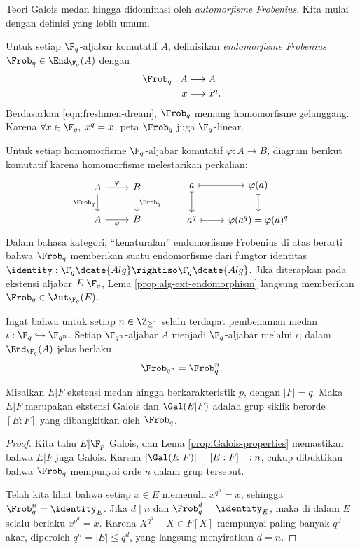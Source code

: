 Teori Galois medan hingga didominasi oleh \emph{automorfisme Frobenius}. Kita mulai dengan definisi yang lebih umum.
\begin{definition}\label{def:Frob-aut} 
	Untuk setiap $\F_q$-aljabar komutatif $A$, definisikan \emph{endomorfisme Frobenius} $\Frob_q \in \End_{\F_q}(A)$ dengan
	\begin{align*}
		\Frob_q: A & \longrightarrow A \\
		x & \longmapsto x^q.
	\end{align*}
	Berdasarkan \eqref{eqn:freshmen-dream}, $\Frob_q$ memang homomorfisme gelanggang. Karena $\forall x \in \F_q, \; x^q=x$, peta $\Frob_q$ juga $\F_q$-linear.
\end{definition}
Untuk setiap homomorfisme $\F_q$-aljabar komutatif $\varphi:A\to B$, diagram berikut komutatif karena homomorfisme melestarikan perkalian:
\[\begin{tikzcd}
	A \arrow[r, "\varphi"] \arrow[d, "\Frob_q"'] & B \arrow[d, "\Frob_q"] \\
	A \arrow[r, "\varphi"'] & B
\end{tikzcd} \qquad \begin{tikzcd}
	a \arrow[mapsto, r] \arrow[mapsto, d] & \varphi(a) \arrow[mapsto, d] \\
	a^q \arrow[mapsto, r] & \varphi(a^q) = \varphi(a)^q
\end{tikzcd}\]
Dalam bahasa kategori, ``kenaturalan'' endomorfisme Frobenius di atas berarti bahwa $\Frob_q$ memberikan suatu endomorfisme dari fungtor identitas $\identity:\F_q\dcate{Alg}\rightiso\F_q\dcate{Alg}$. Jika diterapkan pada ekstensi aljabar $E|\F_q$, Lema \ref{prop:alg-ext-endomorphism} langsung memberikan $\Frob_q\in\Aut_{\F_q}(E)$.

Ingat bahwa untuk setiap $n\in\Z_{\geq1}$ selalu terdapat pembenaman medan $\iota:\F_q\hookrightarrow\F_{q^n}$. Setiap $\F_{q^n}$-aljabar $A$ menjadi $\F_q$-aljabar melalui $\iota$; dalam $\End_{\F_q}(A)$ jelas berlaku
\[ \Frob_{q^n} = \Frob_q^n. \]

\begin{theorem}\label{prop:finite-field-Galois}
	Misalkan $E|F$ ekstensi medan hingga berkarakteristik $p$, dengan $|F|=q$. Maka $E|F$ merupakan ekstensi Galois dan $\Gal(E|F)$ adalah grup siklik berorde $[E:F]$ yang dibangkitkan oleh $\Frob_q$.
\end{theorem}
\begin{proof}
	Kita tahu $E|\F_p$ Galois, dan Lema \ref{prop:Galois-properties} memastikan bahwa $E|F$ juga Galois. Karena $|\Gal(E|F)|=[E:F]=:n$, cukup dibuktikan bahwa $\Frob_q$ mempunyai orde $n$ dalam grup tersebut.

	Telah kita lihat bahwa setiap $x \in E$ memenuhi $x^{q^n}=x$, sehingga $\Frob_q^n = \identity_E$. Jika $d \mid n$ dan $\Frob^d_q = \identity_E$, maka di dalam $E$ selalu berlaku $x^{q^d}=x$. Karena $X^{q^d}-X \in F[X]$ mempunyai paling banyak $q^d$ akar, diperoleh $q^n = |E| \leq q^d$, yang langsung menyiratkan $d=n$.
\end{proof}

